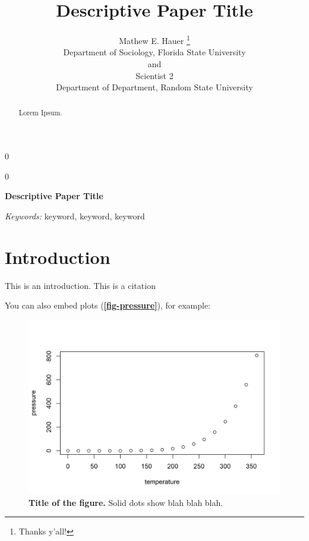\documentclass[12pt]{article}
\newcommand{\blind}{0}
\begin{document}
\def\spacingset#1{\renewcommand{\baselinestretch}%
{#1}\small\normalsize} \spacingset{1}



\blind
{
  \title{\bf Descriptive Paper Title}

  \author{
        Mathew E. Hauer \thanks{Thanks y'all!} \\
    Department of Sociology, Florida State University\\
     and \\     Scientist 2 \\
    Department of Department, Random State University\\
      }
  \maketitle
} \fi

\blind
{
  \bigskip
  \bigskip
  \bigskip
  \begin{center}
    {\LARGE\bf Descriptive Paper Title}
  \end{center}
  \medskip
} \fi

\bigskip
\begin{abstract}
Lorem Ipsum.
\end{abstract}

\noindent%
{\it Keywords:} keyword, keyword, keyword
\vfill

\newpage
\spacingset{1.45} %

\newpage

\hypertarget{introduction}{%
\section{Introduction}\label{introduction}}

This is an introduction. This is a citation
\citep{foxBackNoAnalogFuture2007}

You can also embed plots (\textbf{\autoref{fig-pressure}}), for example:

\begin{figure}
\centering
\includegraphics{manuscript_files/figure-latex/pressure-1.png}
\caption{\textbf{Title of the figure.} Solid dots show blah blah blah.
\label{fig-pressure}}
\end{figure}
\end{document}
